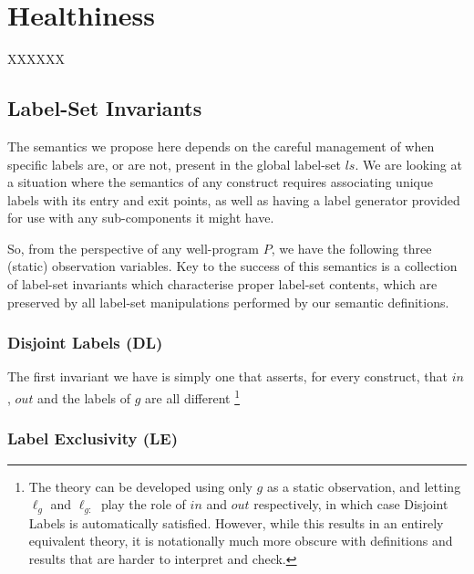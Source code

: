 \section{Healthiness}\label{sec:health}


XXXXXX


\subsection{Label-Set Invariants}

The semantics we propose here depends on the careful management
of when specific labels are, or are not,
present in the global label-set $ls$.
We are looking at a situation where the semantics of any construct
requires associating unique labels with its entry and exit points,
as well as having a label generator provided for use with any sub-components
it might have.

So, from the perspective of any well-program $P$,
we have the following three (static) observation variables.
Key to the success of this semantics is a collection of label-set invariants
which characterise proper label-set contents,
which are preserved by all label-set manipulations performed
by our semantic definitions.

\subsubsection{Disjoint Labels (DL)}\label{sssec:disjoint-labels}

The first invariant we have is simply one that asserts,
for every construct, that $in$, $out$ and the labels of $g$
are all different
\footnote{The theory can be developed using only $g$ as a static observation,
and letting $\ell_g$ and $\ell_{g:}$ play the role of $in$ and $out$
respectively, in which case Disjoint Labels is automatically satisfied.
However, while this results in an entirely equivalent theory,
it is notationally much more obscure
with definitions and results that are harder to interpret and check.
}%



\subsubsection{Label Exclusivity (LE)}\label{sssec:label-exclusivity}

